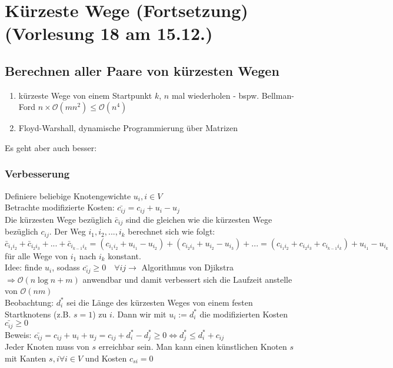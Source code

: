 \section{Kürzeste Wege (Fortsetzung)\tiny (Vorlesung 18 am 15.12.)}
\subsection{Berechnen aller Paare von kürzesten Wegen}
\begin{enumerate}
\item kürzeste Wege von einem Startpunkt $k$, $n$ mal wiederholen - bspw. Bellman-Ford $n\times \mathcal{O}(mn^2) \leq \mathcal{O}(n^4)$
\item Floyd-Warshall, dynamische Programmierung über Matrizen
\end{enumerate}
Es geht aber auch besser:\\
\subsubsection{Verbesserung}
Definiere beliebige Knotengewichte $u_i, i \in V$\\
Betrachte modifizierte Kosten: $\bar{c_{ij}} = c_{ij} + u_i - u_j$\\ 
Die kürzesten Wege bezüglich $\bar{c}_{ij}$ sind die gleichen wie die kürzesten Wege bezüglich $c_{ij}$. Der Weg $i_1,i_2, ... , i_k$ berechnet sich wie folgt: $\bar{c}_{i_{1}i_{2}} + \bar{c}_{i_2i_3} +  ... + \bar{c}_{i_{k-1} i_{k}} = (c_{i_1 i_2} + u_{i_1} - u_{i_2}) + (c_{i_2 i_3} + u_{i_2} - u_{i_3}) + ... = (c_{i_1 i_2} + c_{i_2 i_3} + c_{i_{k-1} i_k}) + u_{i_1} - u_{i_k}$ für alle Wege von $i_1$ nach $i_k$ konstant.\\
Idee: finde $u_i$, sodass $\bar{c_{ij}} \geq 0 \quad \forall ij \rightarrow$ Algorithmus von Djikstra $\Rightarrow \mathcal{O}(n \log n +m)$ anwendbar und damit verbessert sich die Laufzeit anstelle von $\mathcal{O}(nm)$\\
Beobachtung: $d_i^*$ sei die Länge des kürzesten Weges von einem festen Startknotens (z.B. $s=1$) zu $i$. Dann wir mit $u_i := d_i^*$ die modifizierten Kosten $\bar{c_{ij}} \geq 0$\\
Beweis: $\bar{c_{ij}} = c_{ij} + u_i + u_j = c_{ij} + d_i^* - d_j^* \geq 0 \Leftrightarrow d_j^* \leq d_i^* + c_{ij}$\\
Jeder Knoten muss von $s$ erreichbar sein. Man kann einen künstlichen Knoten $s$ mit Kanten $s,i \forall i \in V$ und Kosten $c_{si} = 0$\\
